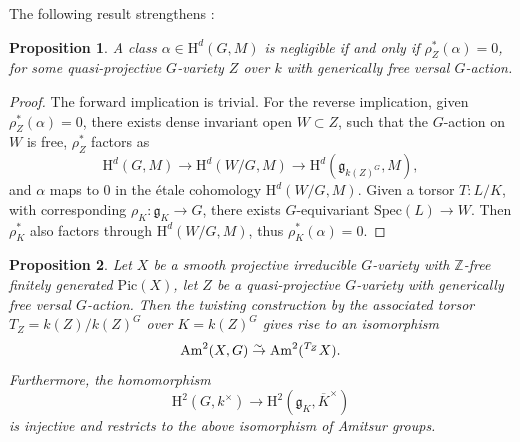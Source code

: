 \documentclass[12pt, reqno]{amsart}
\numberwithin{equation}{section}
\theoremstyle{plain}
\newtheorem{prop}{Proposition}[section]
\theoremstyle{definition}
\newcommand{\eqto}{\stackrel{\lower1.5pt\hbox{$\scriptstyle\sim\,$}}\to}
\def\bZ{{\mathbb Z}}
\def\rH{{\mathrm H}}
\def\Pic{\mathrm{Pic}}
\def\Am{\mathrm{Am}}
\def\Spec{\mathrm{Spec}}
\begin{document}
The following result strengthens \cite[Prop.\ 2.1]{GM}:

\begin{prop}
\label{prop:gm}
A class $\alpha\in \rH^d(G,M)$ is negligible if and only if
$\rho_Z^*(\alpha)=0$, for some quasi-projective $G$-variety $Z$ over $k$ with generically free versal $G$-action.
\end{prop}

\begin{proof}
The forward implication is trivial.
For the reverse implication, given $\rho_Z^*(\alpha)=0$, there exists dense invariant open $W\subset Z$, such that the $G$-action on $W$ is free, $\rho_Z^*$ factors as
\[ \rH^d(G,M)\to \rH^d(W/G,M)\to \rH^d(\mathfrak g_{k(Z)^G},M), \]
and $\alpha$ maps to $0$ in the \'etale cohomology $\rH^d(W/G,M)$.
Given a torsor $T\colon L/K$, with corresponding $\rho_K\colon \mathfrak g_K \to G$, there exists $G$-equivariant $\Spec(L)\to W$.
Then $\rho_K^*$ also factors through $\rH^d(W/G,M)$, thus
$\rho_K^*(\alpha)=0$.
\end{proof}





\begin{prop}
\label{prop.reproduceAm2}
Let $X$ be a smooth projective irreducible $G$-variety with $\bZ$-free finitely generated $\Pic(X)$, let
$Z$ be a quasi-projective $G$-variety with generically free versal $G$-action.
Then the twisting construction by the associated torsor
$T_Z=k(Z)/k(Z)^G$ over $K=k(Z)^G$ gives rise to an isomorphism
\[
\Am^2(X,G)\eqto \Am^2({}^{T_Z} X).
\]
Furthermore, the homomorphism
\[
\rH^2(G,k^\times)\to \rH^2(\mathfrak g_K,\overline{K}^\times)
\]
is injective and restricts to the above isomorphism of Amitsur groups.
\end{prop}
\end{document}

